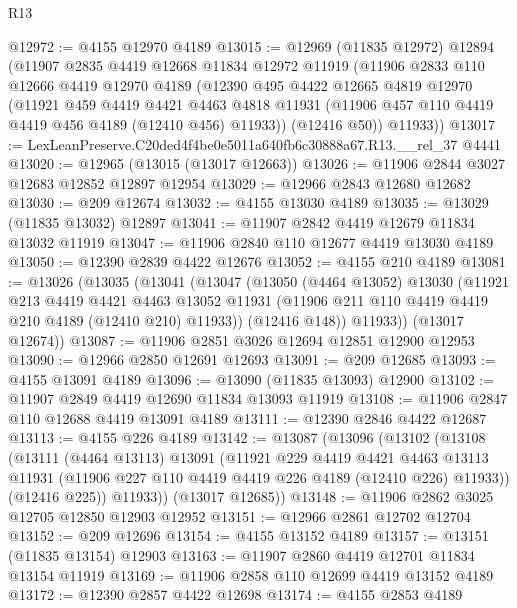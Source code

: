\begin{lexlean}{R13}
\begin{coremodule}
@12972 := @4155 @12970 @4189
@13015 := @12969
    (@11835 @12972)
    @12894
    (@11907
      @2835
      @4419
      @12668
      @11834
      @12972
      @11919
      (@11906
        @2833
        @110
        @12666
        @4419
        @12970
        @4189
        (@12390
          @495
          @4422
          @12665
          @4819
          @12970
          (@11921
            @459
            @4419
            @4421
            @4463
            @4818
            @11931
            (@11906 @457 @110 @4419 @4419 @456 @4189 (@12410 @456) @11933))
          (@12416 @50))
        @11933))
@13017 := LexLeanPreserve.C20ded4f4be0e5011a640fb6c30888a67.R13.__rel_37 @4441
@13020 := @12965 (@13015 (@13017 @12663))
@13026 := @11906 @2844 @3027 @12683 @12852 @12897 @12954
@13029 := @12966 @2843 @12680 @12682
@13030 := @209 @12674
@13032 := @4155 @13030 @4189
@13035 := @13029 (@11835 @13032) @12897
@13041 := @11907 @2842 @4419 @12679 @11834 @13032 @11919
@13047 := @11906 @2840 @110 @12677 @4419 @13030 @4189
@13050 := @12390 @2839 @4422 @12676
@13052 := @4155 @210 @4189
@13081 := @13026
    (@13035
      (@13041
        (@13047
          (@13050
            (@4464 @13052)
            @13030
            (@11921
              @213
              @4419
              @4421
              @4463
              @13052
              @11931
              (@11906 @211 @110 @4419 @4419 @210 @4189 (@12410 @210) @11933))
            (@12416 @148))
          @11933))
      (@13017 @12674))
@13087 := @11906 @2851 @3026 @12694 @12851 @12900 @12953
@13090 := @12966 @2850 @12691 @12693
@13091 := @209 @12685
@13093 := @4155 @13091 @4189
@13096 := @13090 (@11835 @13093) @12900
@13102 := @11907 @2849 @4419 @12690 @11834 @13093 @11919
@13108 := @11906 @2847 @110 @12688 @4419 @13091 @4189
@13111 := @12390 @2846 @4422 @12687
@13113 := @4155 @226 @4189
@13142 := @13087
    (@13096
      (@13102
        (@13108
          (@13111
            (@4464 @13113)
            @13091
            (@11921
              @229
              @4419
              @4421
              @4463
              @13113
              @11931
              (@11906 @227 @110 @4419 @4419 @226 @4189 (@12410 @226) @11933))
            (@12416 @225))
          @11933))
      (@13017 @12685))
@13148 := @11906 @2862 @3025 @12705 @12850 @12903 @12952
@13151 := @12966 @2861 @12702 @12704
@13152 := @209 @12696
@13154 := @4155 @13152 @4189
@13157 := @13151 (@11835 @13154) @12903
@13163 := @11907 @2860 @4419 @12701 @11834 @13154 @11919
@13169 := @11906 @2858 @110 @12699 @4419 @13152 @4189
@13172 := @12390 @2857 @4422 @12698
@13174 := @4155 @2853 @4189

\end{coremodule}
\end{lexlean}
